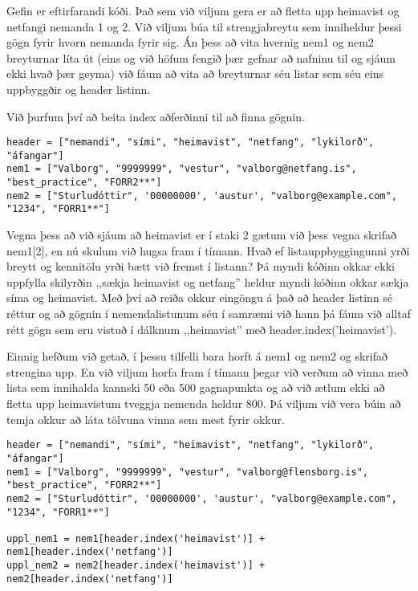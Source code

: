 \begin{exercise}\label{lst3}
Gefin er eftirfarandi kóði.
Það sem við viljum gera er að fletta upp heimavist og netfangi nemanda 1 og 2.
Við viljum búa til strengjabreytu sem inniheldur þessi gögn fyrir hvorn nemanda fyrir sig.
Án þess að vita hvernig nem1 og nem2 breyturnar líta út (eins og við höfum fengið þær gefnar að nafninu til og sjáum ekki hvað þær geyma) við fáum að vita að breyturnar séu listar sem séu eins uppbyggðir og header listinn.

Við þurfum því að beita index aðferðinni til að finna gögnin.
\begin{lstlisting}
header = ["nemandi", "sími", "heimavist", "netfang", "lykilorð", "áfangar"]
nem1 = ["Valborg", "9999999", "vestur", "valborg@netfang.is", "best_practice", "FORR2**"]
nem2 = ["Sturludóttir", '00000000', 'austur', "valborg@example.com", "1234", "FORR1**"]\end{lstlisting}

\end{exercise}
\begin{Answer}[ref={lst3}]
	Vegna þess að við sjáum að heimavist er í staki 2 gætum við þess vegna skrifað nem1[2], en nú skulum við hugsa fram í tímann.
	Hvað ef listauppbyggingunni yrði breytt og kennitölu yrði bætt við fremst í listann?
	Þá myndi kóðinn okkar ekki uppfylla skilyrðin ,,sækja heimavist og netfang'' heldur myndi kóðinn okkar sækja síma og heimavist.
	Með því að reiða okkur eingöngu á það að header listinn sé réttur og að gögnin í nemendalistunum séu í samræmi við hann þá fáum við alltaf rétt gögn sem eru vistuð í dálknum ,,heimavist'' með header.index('heimavist').


	Einnig hefðum við getað, í þessu tilfelli bara horft á nem1 og nem2 og skrifað strengina upp.
	En við viljum horfa fram í tímann þegar við verðum að vinna með lista sem innihalda kannski 50 eða 500 gagnapunkta og að við ætlum ekki að fletta upp heimavistum tveggja nemenda heldur 800.
	Þá viljum við vera búin að temja okkur að láta tölvuna vinna sem mest fyrir okkur. 
\begin{lstlisting}
header = ["nemandi", "sími", "heimavist", "netfang", "lykilorð", "áfangar"]
nem1 = ["Valborg", "9999999", "vestur", "valborg@flensborg.is", "best_practice", "FORR2**"]
nem2 = ["Sturludóttir", '00000000', 'austur', "valborg@example.com", "1234", "FORR1**"]

uppl_nem1 = nem1[header.index('heimavist')] + nem1[header.index('netfang')]
uppl_nem2 = nem2[header.index('heimavist')] + nem2[header.index('netfang')]\end{lstlisting}
\end{Answer}
